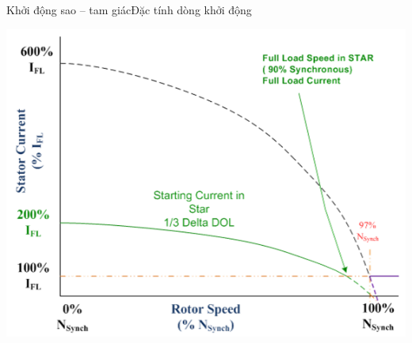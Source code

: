 \documentclass[17pt]{beamer}
\begin{document}
\begin{frame}{Khởi động sao -- tam giác}{Đặc tính dòng khởi động}
\vspace{-.5cm}
\begin{center}
\includegraphics[scale=.5]{images-chude1/dongdien-sao.png} 
\end{center}
\end{frame}
\end{document}
